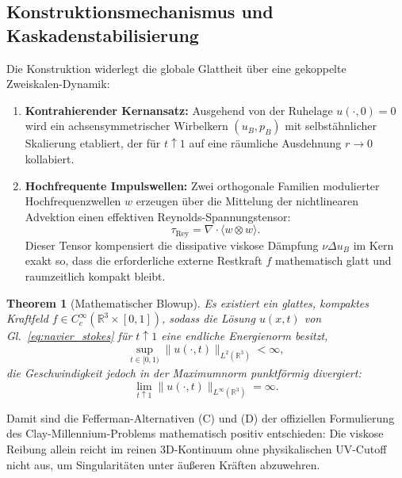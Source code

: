 \documentclass[11pt,a4paper]{article}
\newtheorem{theorem}{Theorem}[section]
\theoremstyle{remark}
\begin{document}
\subsection{Konstruktionsmechanismus und Kaskadenstabilisierung}
Die Konstruktion widerlegt die globale Glattheit über eine gekoppelte Zweiskalen-Dynamik:
\begin{enumerate}
    \item \textbf{Kontrahierender Kernansatz:} Ausgehend von der Ruhelage $u(\cdot, 0) = 0$ wird ein achsensymmetrischer Wirbelkern $(u_B, p_B)$ mit selbstähnlicher Skalierung etabliert, der für $t \uparrow 1$ auf eine räumliche Ausdehnung $r \to 0$ kollabiert.
    \item \textbf{Hochfrequente Impulswellen:} Zwei orthogonale Familien modulierter Hochfrequenzwellen $w$ erzeugen über die Mittelung der nichtlinearen Advektion einen effektiven Reynolds-Spannungstensor:
    \begin{equation}
    \tau_{\mathrm{Rey}} = \nabla \cdot \langle w \otimes w \rangle.
    \end{equation}
    Dieser Tensor kompensiert die dissipative viskose Dämpfung $\nu \Delta u_B$ im Kern exakt so, dass die erforderliche externe Restkraft $f$ mathematisch glatt und raumzeitlich kompakt bleibt.
\end{enumerate}

\begin{theorem}[Mathematischer Blowup]
Es existiert ein glattes, kompaktes Kraftfeld $f \in C_c^\infty(\mathbb{R}^3 \times [0, 1])$, sodass die Lösung $u(x, t)$ von Gl.~\eqref{eq:navier_stokes} für $t \uparrow 1$ eine endliche Energienorm besitzt,
\begin{equation}
\sup_{t \in [0, 1)} \| u(\cdot, t) \|_{L^2(\mathbb{R}^3)} < \infty,
\end{equation}
die Geschwindigkeit jedoch in der Maximumnorm punktförmig divergiert:
\begin{equation}
\lim_{t \uparrow 1} \| u(\cdot, t) \|_{L^\infty(\mathbb{R}^3)} = \infty.
\end{equation}
\end{theorem}

Damit sind die Fefferman-Alternativen (C) und (D) der offiziellen Formulierung des Clay-Millennium-Problems mathematisch positiv entschieden: Die viskose Reibung allein reicht im reinen 3D-Kontinuum ohne physikalischen UV-Cutoff nicht aus, um Singularitäten unter äußeren Kräften abzuwehren.

\end{document}
